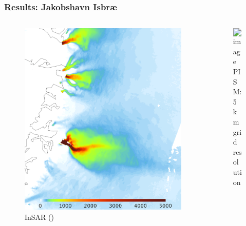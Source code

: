 \documentclass[intlimits]{beamer}
\begin{document}
\begin{frame}
  \frametitle{Results: Jakobshavn Isbr{\ae}}
  \vspace{-2em}
  \begin{columns}[t]
    \begin{column}{.48\linewidth}
      \begin{figure}
        \includegraphics[width=\textwidth]{jak-insar-csurf} \\
        \small{InSAR ()}
      \end{figure}
    \end{column}
    \begin{column}{.48\linewidth}
      \begin{figure}
        \includegraphics<1>[width=\textwidth]{jak5km-ssa-csurf} \\
        \small{PISM: 5\,km grid resolution}
      \end{figure}
    \end{column}
  \end{columns}
\end{frame}
\end{document}
